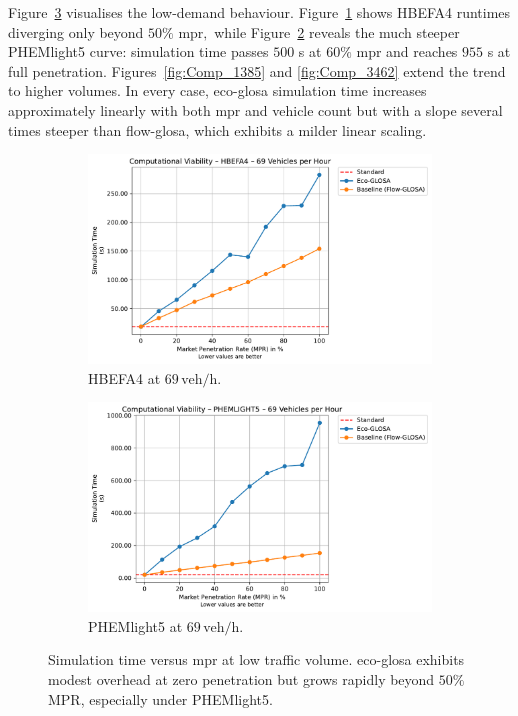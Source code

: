 \mynewline
Figure~\ref{fig:Comp_69} visualises the low-demand behaviour. Figure~\ref{fig:Comp_69_HBEFA4} shows HBEFA4 runtimes diverging only beyond $50\%$ \ac{mpr}$,$ while Figure~\ref{fig:Comp_69_PHEM} reveals the much steeper PHEMlight5 curve: simulation time passes $500$ s at $60\%$ \ac{mpr} and reaches $955$ s at full penetration. Figures~\ref{fig:Comp_1385} and \ref{fig:Comp_3462} extend the trend to higher volumes. In every case, \ac{eco-glosa} simulation time increases approximately linearly with both \ac{mpr} and vehicle count but with a slope several times steeper than \ac{flow-glosa}, which exhibits a milder linear scaling.

\begin{figure}[htb]
  \centering
  \begin{subfigure}[b]{0.45\textwidth}
    \includegraphics[width=\textwidth]{data/img/ComputationalViability/ComputationalViability_HBEFA4_Cars69.pdf}
    \caption{HBEFA4 at $69\,\mathrm{veh/h}$.}
    \label{fig:Comp_69_HBEFA4}
  \end{subfigure}\hfill
  \begin{subfigure}[b]{0.45\textwidth}
    \includegraphics[width=\textwidth]{data/img/ComputationalViability/ComputationalViability_PHEMLIGHT5_Cars69.pdf}
    \caption{PHEMlight5 at $69\,\mathrm{veh/h}$.}
    \label{fig:Comp_69_PHEM}
  \end{subfigure}
  \caption{Simulation time versus \ac{mpr} at low traffic volume.  \ac{eco-glosa} exhibits modest overhead at zero penetration but grows rapidly beyond $50\%$ MPR, especially under PHEMlight5.}
  \label{fig:Comp_69}
\end{figure}

